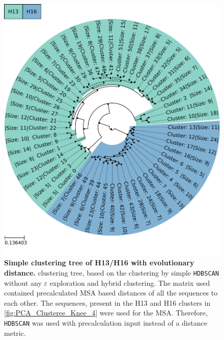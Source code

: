 \begin{figure}[!hbt]
    \centering
    \includegraphics[width=\textwidth]{PCA/Clustertree_Segment_4_H_Focus.pdf}
    \caption[Simple clustering tree of H13/H16 with evolutionary distance]{\textbf{Simple clustering tree of H13/H16 with evolutionary distance.} clustering tree, based on the clustering by simple \texttt{HDBSCAN} without any $\varepsilon$ exploration and hybrid clustering. The matrix used contained precalculated \gls{MSA} based distances of all the sequences to each other. The sequences, present in the H13 and H16 clusters in \autoref{fig:PCA_Clusteree_Knee_4} were used for the \gls{MSA}. Therefore, \texttt{HDBSCAN} was used with precalculation input instead of a distance metric.}
    \label{fig:Simple_Clustertree_MSA}
\end{figure}

